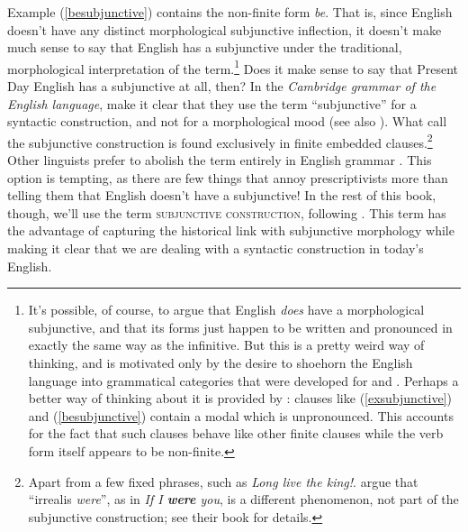 \noindent Example (\ref{besubjunctive}) contains the non-finite form \textit{be}. That is, since English doesn't have any distinct morphological subjunctive inflection, it doesn't make much sense to say that English has a subjunctive under the traditional, morphological interpretation of the term.\footnote{It's possible, of course, to argue that English \textit{does} have a morphological subjunctive, and that its forms just happen to be written and pronounced in exactly the same way as the infinitive. But this is a pretty weird way of thinking, and is motivated only by the desire to shoehorn the English language into grammatical categories that were developed for  and . Perhaps a better way of thinking about it is provided by \citet[40--42]{Roberts1985}: clauses like (\ref{exsubjunctive}) and (\ref{besubjunctive}) contain a modal which is unpronounced. This accounts for the fact that such clauses behave like other finite clauses while the verb form itself appears to be non-finite.} Does it make sense to say that Present Day English has a subjunctive at all, then? In the \textit{Cambridge grammar of the English language}, \citet[88]{HuddlestonePullum2002} make it clear that they use the term ``subjunctive'' for a syntactic construction, and not for a morphological mood (see also \citealp{Aarts2011}). What \citet{HuddlestonePullum2002} call the subjunctive construction is found exclusively in finite embedded clauses.\footnote{Apart from a few fixed phrases, such as \textit{Long live the king!}. \citet[87]{HuddlestonePullum2002} argue that ``irrealis \textit{were}'', as in \textit{If I \textbf{were} you}, is a different phenomenon, not part of the subjunctive construction; see their book for details.} Other linguists prefer to abolish the term entirely in English grammar \citep{Palmer1988}. This option is tempting, as there are few things that annoy prescriptivists more than telling them that English doesn't have a subjunctive! In the rest of this book, though, we'll use the term \textsc{subjunctive construction}, following \citet{HuddlestonePullum2002}. This term has the advantage of capturing the historical link with subjunctive morphology while making it clear that we are dealing with a syntactic construction in today's English.

